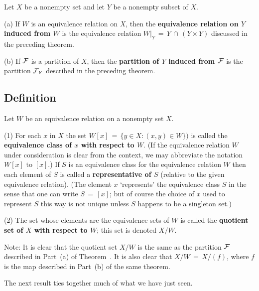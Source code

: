         Let $X$ be a nonempty set and let $Y$ be a nonempty subset of $X$.

\V

        (a) If $W$ is an equivalence relation on $X$, then the {\bf equivalence relation on $Y$ induced from $W$} is the equivalence relation $W|_{Y} \,=\, Y\,{\cap}\,(Y{\times}Y)$ discussed in the preceding theorem.

\V

        (b)  If ${\cal F}$ is a partition of $X$, then the {\bf partition of $Y$ induced from ${\cal F}$} is the partition ${\cal F}_{Y}$ described in the preceding theorem.
    

 
        \subsection{\small{{\bf Definition}}}
                \label{DefA50.120}

        Let $W$ be an equivalence relation on a nonempty set $X$.

\V

        (1) For each $x$ in $X$ the set $W[x] \,=\, \{y{\in}X: (x,y){\in}W\})$ is called the {\bf equivalence class of $x$ with respect to $W$}.
    (If the equivalence relation $W$ under consideration is clear from the context,  we may abbreviate the notation $W[x]$ to $[x]$.)
    If $S$ is an equivalence class for the equivalence relation $W$ then each element of $S$ is called a {\bf representative of $S$} (relative to the given equivalence relation).
    (The element $x$ `represents' the equivalence class $S$ in the sense that one can write $S \,=\, [x]$;
    but of course the choice of $x$ used to represent $S$ this way is not unique unless $S$ happens to be a singleton set.)

\V

        (2) The set whose elements are the equivalence sets of $W$ is called the {\bf quotient set of $X$ with respect to $W$}; this set is denoted $X/W$.

\V

        Note: It is clear that the quotient set $X/W$ is the same as the partition ${\cal F}$ described in Part~(a) of Theorem~.
    It is also clear that $X/W \,=\, X/(f)$, where $f$ is the map described in Part~(b) of the same theorem.


\V
\V

        The next result ties together much of what we have just seen.


